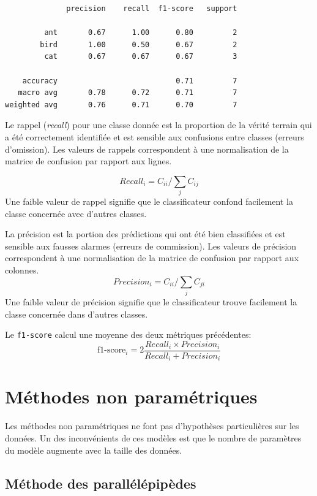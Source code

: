 \documentclass[
  french,
  11pt,
  letterpaper,
  open=any,
  twoside=false,
  french]{scrbook}
\begin{document}
\begin{verbatim}
              precision    recall  f1-score   support

         ant       0.67      1.00      0.80         2
        bird       1.00      0.50      0.67         2
         cat       0.67      0.67      0.67         3

    accuracy                           0.71         7
   macro avg       0.78      0.72      0.71         7
weighted avg       0.76      0.71      0.70         7
\end{verbatim}

Le rappel (\emph{recall}) pour une classe donnée est la proportion de la
vérité terrain qui a été correctement identifiée et est sensible aux
confusions entre classes (erreurs d'omission). Les valeurs de rappels
correspondent à une normalisation de la matrice de confusion par rapport
aux lignes.

\[
Recall_i= C_{ii} / \sum_j C_{ij}
\] Une faible valeur de rappel signifie que le classificateur confond
facilement la classe concernée avec d'autres classes.

La précision est la portion des prédictions qui ont été bien classifiées
et est sensible aux fausses alarmes (erreurs de commission). Les valeurs
de précision correspondent à une normalisation de la matrice de
confusion par rapport aux colonnes. \[
Precision_i= C_{ii} / \sum_j C_{ji}
\] Une faible valeur de précision signifie que le classificateur trouve
facilement la classe concernée dans d'autres classes.

Le \texttt{f1-score} calcul une moyenne des deux métriques précédentes:
\[
\text{f1-score}_i=2\frac{Recall_i \times Precision_i}{Recall_i + Precision_i}
\]

\section{Méthodes non
paramétriques}\label{muxe9thodes-non-paramuxe9triques}

Les méthodes non paramétriques ne font pas d'hypothèses particulières
sur les données. Un des inconvénients de ces modèles est que le nombre
de paramètres du modèle augmente avec la taille des données.

\subsection{Méthode des parallélépipèdes}\label{sec-0511}
\end{document}
